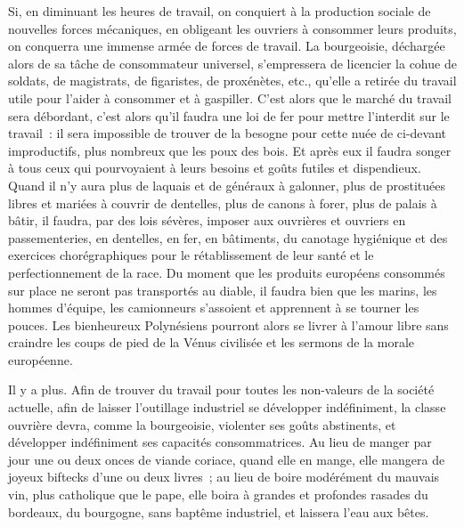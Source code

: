 \documentclass[french,twoside]{book} %
\newcommand\chaptercont{} %
\begin{document}
\chaptercont
\noindent Si, en diminuant les heures de travail, on conquiert à la production sociale de nouvelles forces mécaniques, en obligeant les ouvriers à consommer leurs produits, on conquerra une immense armée de forces de travail. La bourgeoisie, déchargée alors de sa tâche de consommateur universel, s’empressera de licencier la cohue de soldats, de magistrats, de figaristes, de proxénètes, etc., qu’elle a retirée du travail utile pour l’aider à consommer et à gaspiller. C’est alors que le marché du travail sera débordant, c’est alors qu’il faudra une loi de fer pour mettre l’interdit sur le travail : il sera impossible de trouver de la besogne pour cette nuée de ci-devant improductifs, plus nombreux que les poux des bois. Et après eux il faudra songer à tous ceux qui pourvoyaient à leurs besoins et goûts futiles et dispendieux. Quand il n’y aura plus de laquais et de généraux à galonner, plus de prostituées libres et mariées à couvrir de dentelles, plus de canons à forer, plus de palais à bâtir, il faudra, par des lois sévères, imposer aux ouvrières et ouvriers en passementeries, en dentelles, en fer, en bâtiments, du canotage hygiénique et des exercices chorégraphiques pour le rétablissement de leur santé et le perfectionnement de la race. Du moment que les produits européens consommés sur place ne seront pas transportés au diable, il faudra bien que les marins, les hommes d’équipe, les camionneurs s’assoient et apprennent à se tourner les pouces. Les bienheureux Polynésiens pourront alors se livrer à l’amour libre sans craindre les coups de pied de la Vénus civilisée et les sermons de la morale européenne.\par
Il y a plus. Afin de trouver du travail pour toutes les non-valeurs de la société actuelle, afin de laisser l’outillage industriel se développer indéfiniment, la classe ouvrière devra, comme la bourgeoisie, violenter ses goûts abstinents, et développer indéfiniment ses capacités consommatrices. Au lieu de manger par jour une ou deux onces de viande coriace, quand elle en mange, elle mangera de joyeux biftecks d’une ou deux livres ; au lieu de boire modérément du mauvais vin, plus catholique que le pape, elle boira à grandes et profondes rasades du bordeaux, du bourgogne, sans baptême industriel, et laissera l’eau aux bêtes.\par
\end{document}
